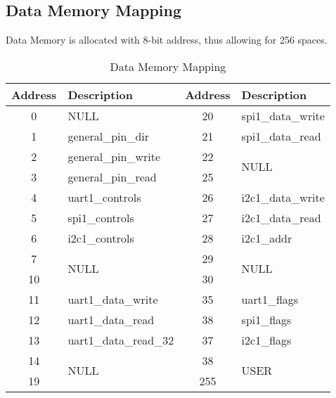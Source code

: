 \subsection{Data Memory Mapping}
Data Memory is allocated with 8-bit address, thus allowing for 256 spaces.

\begin{table}[!h]
    \centering
    \caption{Data Memory Mapping}
    \label{table:memory_map}
    \begin{tabular}{|c|l||c|l|}
        \hline
        \multicolumn{1}{|l|}{Address} & Description           & \multicolumn{1}{l|}{Address} & Description           \\ \hline
        0                             & NULL                  & 20                           & spi1\_data\_write     \\ \hline
        1                             & general\_pin\_dir     & 21                           & spi1\_data\_read      \\ \hline
        2                             & general\_pin\_write   & 22                           & \multirow{2}{*}{NULL} \\ \cline{1-3}
        3                             & general\_pin\_read    & 25                           &                       \\ \hline
        4                             & uart1\_controls       & 26                           & i2c1\_data\_write     \\ \hline
        5                             & spi1\_controls        & 27                           & i2c1\_data\_read      \\ \hline
        6                             & i2c1\_controls        & 28                           & i2c1\_addr            \\ \hline
        7                             & \multirow{2}{*}{NULL} & 29                           & \multirow{2}{*}{NULL} \\ \cline{1-1} \cline{3-3}
        10                            &                       & 30                           &                       \\ \hline
        11                            & uart1\_data\_write    & 35                           & uart1\_flags          \\ \hline
        12                            & uart1\_data\_read     & 38                           & spi1\_flags           \\ \hline
        13                            & uart1\_data\_read\_32 & 37                           & i2c1\_flags           \\ \hline
        14                            & \multirow{2}{*}{NULL} & 38                           & \multirow{2}{*}{USER} \\ \cline{1-1} \cline{3-3}
        19                            &                       & 255                          &                       \\ \hline
    \end{tabular}
\end{table}
